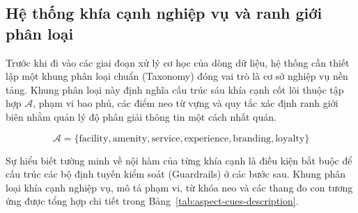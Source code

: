 \subsection{Hệ thống khía cạnh nghiệp vụ và ranh giới phân loại}
\label{subsec:method1-aspect-taxonomy}

Trước khi đi vào các giai đoạn xử lý cơ học của dòng dữ liệu, hệ thống cần thiết lập một khung phân loại chuẩn (Taxonomy) đóng vai trò là cơ sở nghiệp vụ nền tảng. Khung phân loại này định nghĩa cấu trúc sáu khía cạnh cốt lõi thuộc tập hợp $\mathcal{A}$, phạm vi bao phủ, các điểm neo từ vựng và quy tắc xác định ranh giới biên nhằm quản lý độ phân giải thông tin một cách nhất quán.

\begin{equation}
\mathcal{A} = \{\mathrm{facility}, \mathrm{amenity}, \mathrm{service}, \mathrm{experience}, \mathrm{branding}, \mathrm{loyalty}\}
\label{eq:method1-aspect-set-definition}
\end{equation}

Sự hiểu biết tường minh về nội hàm của từng khía cạnh là điều kiện bắt buộc để cấu trúc các bộ định tuyến kiểm soát (Guardrails) ở các bước sau. Khung phân loại khía cạnh nghiệp vụ, mô tả phạm vi, từ khóa neo và các thang đo con tương ứng được tổng hợp chi tiết trong Bảng~\ref{tab:aspect-cues-description}.

